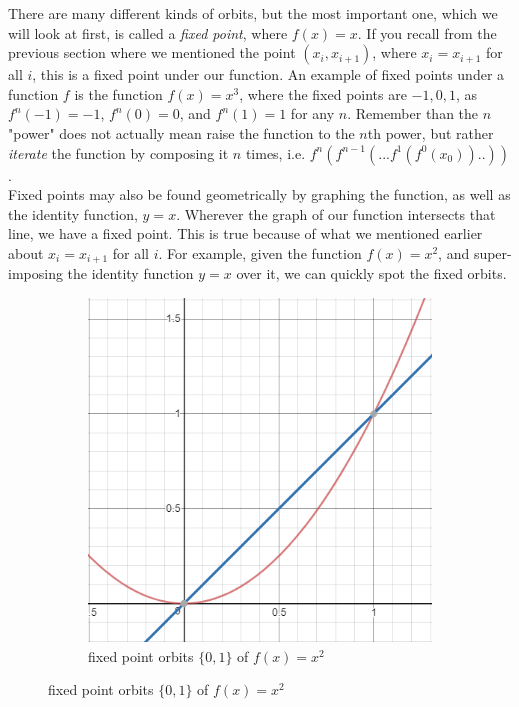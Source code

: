 \documentclass[20pt]{article} %
\begin{document}
There are many different kinds of orbits, but the most important one, which we will look at first, is called a \textit{fixed point}, where $f(x) = x$.  If you recall from the previous section where we mentioned the point $(x_i, x_{i+1})$, where $x_i = x_{i+1}$ for all $i$, this is a fixed point under our function. An example of fixed points under a function $f$ is the function $f(x) = x^{3}$, where the fixed points are $-1, 0, 1$, as$ f^{n}(-1)=-1$, $f^{n}(0)=0$, and $f^{n}(1)=1$ for any $n$. Remember than the $n$ "power" does not actually mean raise the function to the $n$th power, but rather \textit{iterate} the function by composing it $n$ times, i.e. $f^{n}(f^{n-1}(...f^{1}(f^{0}(x_0))..))$. \\

Fixed points may also be found geometrically by graphing the function, as well as the identity function, $y=x$.  Wherever the graph of our function intersects that line, we have a fixed point.  This is true because of what we mentioned earlier about $x_i = x_{i+1}$ for all $i$.  For example, given the function $f(x) = x^{2}$, and super-imposing the identity function $y=x$ over it, we can quickly spot the fixed orbits.

\begin{figure}[!htbp]
  	\centering
   	\begin{subfigure}[p]{0.5\linewidth}
    	\includegraphics[width=\linewidth]{./figures/fp-1.png}
	\caption{fixed point orbits $\{0,1\}$ of $f(x)=x^{2}$}
   	\end{subfigure}
\end{figure} 
\end{document}
